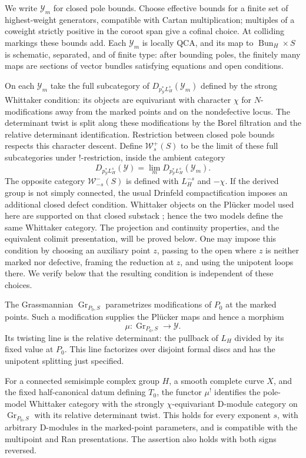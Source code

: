 We write $\mathcal Y_m$ for closed pole bounds. Choose effective bounds for
a finite set of highest-weight generators, compatible with Cartan
multiplication; multiples of a coweight strictly positive in the coroot
span give a cofinal choice. At colliding markings these bounds add. Each
$\mathcal Y_m$ is locally QCA, and its map to
$\operatorname{Bun}_H\times S$ is schematic, separated, and of finite type:
after bounding poles, the finitely many maps are sections of vector bundles
satisfying equations and open conditions.

On each $\mathcal Y_m$ take the full subcategory of
$D_{p_{\mathcal Y}^*L_H^s}(\mathcal Y_m)$ defined by the strong Whittaker
condition: its objects are equivariant with character $\chi$ for
$N$-modifications away from the marked points and on the nondefective
locus. The determinant twist is split along these modifications by the
Borel filtration and the relative determinant identification. Restriction
between closed pole bounds respects this character descent. Define
$\mathcal W_s^+(S)$ to be the limit of these full subcategories under
$!$-restriction, inside the ambient category
\[
 D_{p_{\mathcal Y}^*L_H^s}(\mathcal Y)
 =\lim_m D_{p_{\mathcal Y}^*L_H^s}(\mathcal Y_m).
\]
The opposite category $\mathcal W_{-s}^-(S)$ is defined with $L_H^{-s}$
and $-\chi$. If the derived group is not simply connected, the usual
Drinfeld compactification imposes an additional closed defect condition.
Whittaker objects on the Pl\"ucker model used here are supported on that
closed substack \cite[Remark~4.1.2]{GaitsgoryWhit}; hence the two models
define the same Whittaker category. The projection and continuity properties, and the equivalent
colimit presentation, will be proved below. One may impose this condition by choosing an auxiliary point $z$, passing
to the open where $z$ is neither marked nor defective, framing the
reduction at $z$, and using the unipotent loops there. We verify below that
the resulting condition is independent of these choices.

The Grassmannian $\operatorname{Gr}_{P_0,S}$ parametrizes modifications of
$P_0$ at the marked points. Such a modification supplies the Pl\"ucker
maps and hence a morphism
\[
 \mu:\operatorname{Gr}_{P_0,S}\longrightarrow\mathcal Y.
\]
Its twisting line is the relative determinant: the pullback of $L_H$
divided by its fixed value at $P_0$. This line factorizes over disjoint
formal discs and has the unipotent splitting just specified.

\begin{proposition}
\label{whittaker:model-comparison}
For a connected semisimple complex group $H$, a smooth complete curve $X$,
and the fixed half-canonical datum defining $T_0$, the functor $\mu^!$
identifies the pole-model Whittaker category with the strongly
$\chi$-equivariant D-module category on
$\operatorname{Gr}_{P_0,S}$ with its relative determinant twist. This holds
for every exponent $s$, with arbitrary D-modules in the marked-point
parameters, and is compatible with the multipoint and Ran presentations.
The assertion also holds with both signs reversed.
\end{proposition}

